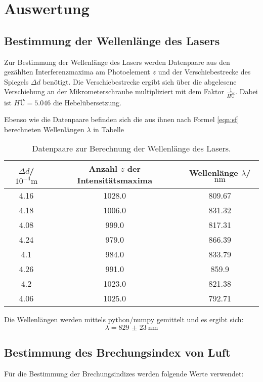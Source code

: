 \section{Auswertung}
\label{sec:Auswertung}
\subsection{Bestimmung der Wellenlänge des Lasers}
Zur Bestimmung der Wellenlänge des Lasers werden Datenpaare aus den gezählten Interferenzmaxima am Photoelement $z$ und der Verschiebestrecke des Spiegels $\Delta d$ benötigt.
Die Verschiebestrecke ergibt sich über die abgelesene Verschiebung an der Mikrometerschraube multipliziert mit dem Faktor $\frac{1}{HÜ}$.
Dabei ist $HÜ=5.046$ die Hebelübersetzung.

Ebenso wie die Datenpaare befinden sich die aus ihnen nach Formel \eqref{eqn:sf} berechneten Wellenlängen $\lambda $ in Tabelle %
\begin{table}
  \caption{Datenpaare zur Berechnung der Wellenlänge des Lasers.}
  \label{tab:spieglein}
  \centering
\begin{tabular}{ccc}
  \toprule
$\Delta d$/$10^{-4}\si{\meter}$ & Anzahl $z$ der Intensitätsmaxima & Wellenlänge $\lambda$/$\si{\nano\meter}$ \\
\midrule
4.16 & 1028.0 & 809.67 \\
4.18 & 1006.0 & 831.32 \\
4.08 & 999.0 & 817.31 \\
4.24 & 979.0 & 866.39 \\
4.1 & 984.0 & 833.79 \\
4.26 & 991.0 & 859.9 \\
4.2 & 1023.0 & 821.38 \\
4.06 & 1025.0 & 792.71 \\
\bottomrule
\end{tabular}
\end{table}


Die Wellenlängen werden mittels python/numpy \cite{numpy} gemittelt und es ergibt sich:
\begin{equation}
\lambda=  \SI{829(23)}{\nano\meter}
\end{equation}

\subsection{Bestimmung des Brechungsindex von Luft}

Für die Bestimmung der Brechungsindizes werden folgende Werte verwendet:

